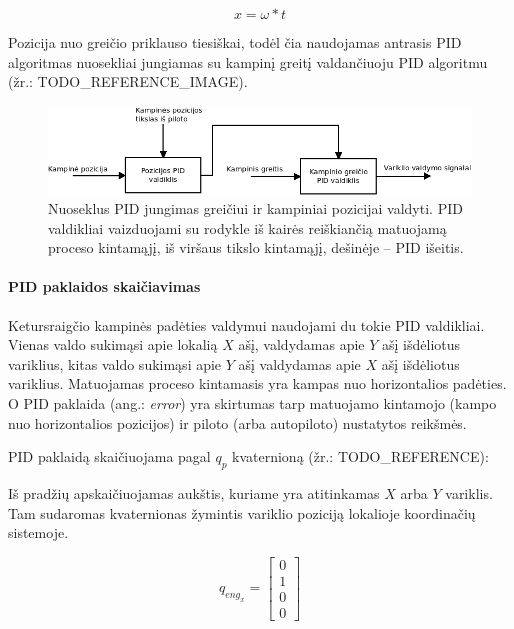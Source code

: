 \documentclass[12pt, a4paper, lithuanian, final]{article}
\begin{document}
\begin{equation}
	x =  \omega * t
\end{equation}

Pozicija nuo greičio priklauso tiesiškai, todėl čia naudojamas antrasis PID algoritmas nuosekliai jungiamas su kampinį greitį valdančiuoju PID algoritmu (žr.: TODO\_REFERENCE\_IMAGE).

\begin{figure}[H]
\begin{center}
\includegraphics[width=1.0\textwidth]{img/PID-chaining.png}
\caption{Nuoseklus PID jungimas greičiui ir kampiniai pozicijai valdyti. PID valdikliai vaizduojami su rodykle iš kairės reiškiančią matuojamą proceso kintamąjį, iš viršaus tikslo kintamąjį, dešinėje -- PID išeitis.}
\end{center}
\end{figure}


\paragraph{PID paklaidos skaičiavimas}
Ketursraigčio kampinės padėties valdymui naudojami du tokie PID valdikliai.
Vienas valdo sukimąsi apie lokalią $X$ ašį, valdydamas apie $Y$ ašį išdėliotus variklius, kitas valdo sukimąsi apie $Y$ ašį valdydamas apie $X$ ašį išdėliotus variklius.
Matuojamas proceso kintamasis yra kampas nuo horizontalios padėties.
O PID paklaida (ang.: \textit{error}) yra skirtumas tarp matuojamo kintamojo (kampo nuo horizontalios pozicijos) ir piloto (arba autopiloto) nustatytos reikšmės.

PID paklaidą skaičiuojama pagal $q_p$ kvaternioną (žr.: TODO\_REFERENCE):

Iš pradžių apskaičiuojamas aukštis, kuriame yra atitinkamas $X$ arba $Y$ variklis.
Tam sudaromas kvaternionas žymintis variklio poziciją lokalioje koordinačių sistemoje.

\begin{equation}
	q_{eng_x} = \left[
		\begin{array}{c}
			0 \\
			1 \\
			0 \\
			0
		\end{array}
	\right]
\end{equation}
\end{document}

